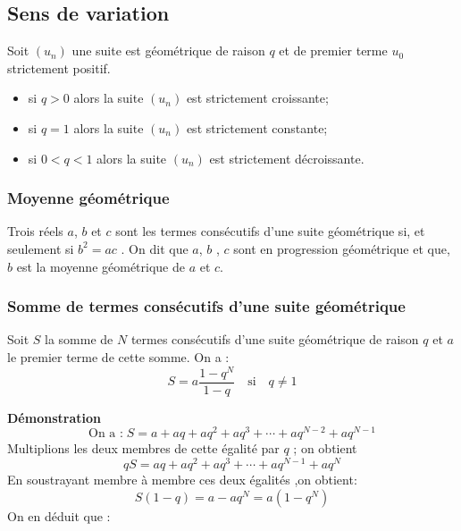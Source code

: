   \subsection*{Sens de variation}

\begin{theorem} 

Soit $(u_{n})$ une  suite est géométrique  de raison $ q $  et de premier terme $u_{0} $  strictement positif.
  \begin{itemize}
  \item si $ q>0 $ alors la suite  $(u_{n})$ est strictement croissante;
   \item si $ q=1 $ alors la suite  $(u_{n})$ est strictement constante;
    \item si $ 0<q<1 $ alors la suite  $(u_{n})$ est strictement décroissante.
  \end{itemize}
  \end{theorem}
   \subsubsection*{Moyenne géométrique}
  Trois réels $ a$, $ b$  et $ c$ sont les termes consécutifs d'une suite géométrique si, et seulement si $ b^{2}=ac $ . On dit que $ a$, $ b$ , $ c$ sont en progression géométrique et que, $ b$ est la moyenne géométrique de $ a $ et $ c$.
 
 \subsubsection*{Somme de termes consécutifs d'une suite géométrique}
 \begin{theorem}
  Soit $S$ la somme  de $ N $ termes consécutifs d'une  suite  géométrique  de raison $q $ et $ a $ le premier terme de cette somme. On a  : \[  S = a \dfrac{1-q^{N}}{1-q} \quad \text{si}\quad q\neq 1\]
  \end{theorem}
 
\textbf{Démonstration} 
  \[\text{On a :} \; S= a+aq+ aq^{2}+ aq^{3}+ \cdots + aq^{N-2}+aq^{N-1}\]
  Multiplions les deux membres de cette égalité par $ q $ ; on obtient
   \[qS= aq+ aq^{2}+ aq^{3}+ \cdots + aq^{N-1}+aq^{N} \] 
   En soustrayant  membre à membre ces deux égalités ,on obtient:
   \[S(1-q)=a-aq^{N}=a(1-q^{N})\] On en déduit que :
   
